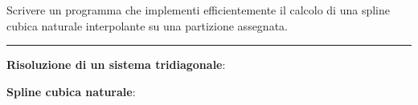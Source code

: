 Scrivere un programma che implementi efficientemente il calcolo di una spline cubica naturale interpolante su una partizione assegnata.

\hspace*{\fill}
\par\noindent\rule{\textwidth}{0.4pt}
\hspace*{\fill}

\textbf{Risoluzione di un sistema tridiagonale}:

\textbf{Spline cubica naturale}:

